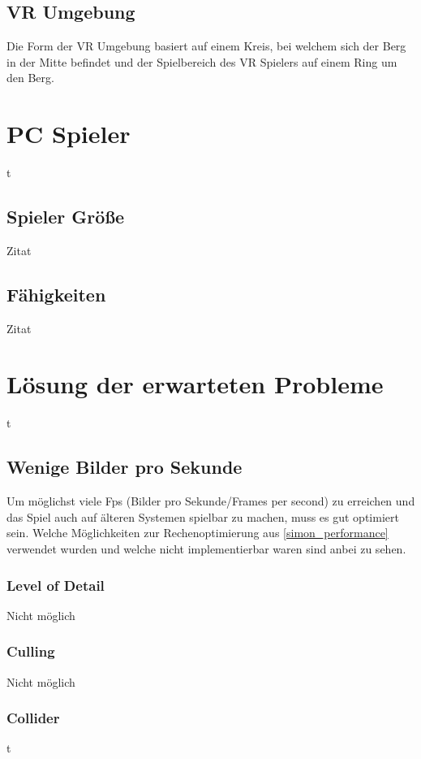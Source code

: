 \subsection{VR Umgebung}
Die Form der VR Umgebung basiert auf einem Kreis, bei welchem sich der Berg in der Mitte befindet und der Spielbereich des VR Spielers auf einem Ring um den Berg.

\section{PC Spieler}
t

\subsection{Spieler Größe}
Zitat

\subsection{Fähigkeiten}
Zitat

\section{Lösung der erwarteten Probleme}\label{simon_problems}
t

\subsection{Wenige Bilder pro Sekunde}
Um möglichst viele Fps (Bilder pro Sekunde/Frames per second) zu erreichen und das Spiel auch auf älteren Systemen spielbar zu machen, muss es gut optimiert sein. Welche Möglichkeiten zur Rechenoptimierung aus \ref{simon_performance} verwendet wurden und welche nicht implementierbar waren sind anbei zu sehen.

\subsubsection{Level of Detail}
Nicht möglich

\subsubsection{Culling}
Nicht möglich

\subsubsection{Collider}
t

